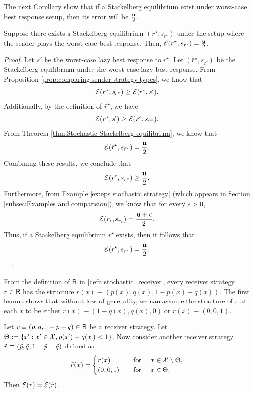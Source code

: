 The next Corollary show that if a Stackelberg equilibrium exist under worst-case best response setup, then its error will be $\frac{\mathbf{u}}{2}$.
\begin{cor}\label{cor:Stackelberg worst case best response error}
    Suppose there exists a Stackelberg equilibrium $(r^\star, s_{r^\star})$ under the setup where the sender plays the worst-case best response. Then, $\mathcal{E}(r^\star,s_{r^\star}) = \frac{\mathbf{u}}{2}$.
\end{cor}


\begin{proof}\label{proof:Stackelberg worst case best response error}
        Let $s'$ be the worst-case lazy best response to $r^\star$. Let $(\bar{r}^\star, s_{\bar{r}^\star})$ be the Stackelberg equilibrium under the worst-case lazy best response.
    From Proposition \ref{prop:comparing sender strategy types}, we know that
    \[
    \mathcal{E}(r^\star, s_{r^\star}) \geq \mathcal{E}(r^\star, s').
    \]
    Additionally, by the definition of $\bar{r}^\star$, we have
    \[
    \mathcal{E}(r^\star, s') \geq \mathcal{E}(\bar{r}^\star, s_{\bar{r}^\star}).
    \]
    From Theorem \ref{thm:Stochastic Stackelberg equilibrium}, we know that
    \[
    \mathcal{E}(\bar{r}^\star, s_{\bar{r}^\star}) = \frac{\mathbf{u}}{2}.
    \]
    Combining these results, we conclude that
    \[
    \mathcal{E}(r^\star, s_{r^\star}) \geq \frac{\mathbf{u}}{2}.
    \]
    Furthermore, from Example \ref{ex:eps stochastic strategy} (which appears in Section \ref{subsec:Examples and comparision}), we know that for every $\epsilon > 0$,
    \[
    \mathcal{E}(r_\epsilon,s_{r_\epsilon}) = \frac{\mathbf{u} + \epsilon}{2}.
    \]
    Thus, if a Stackelberg equilibrium $r^\star$ exists, then it follows that
    \[
    \mathcal{E}(r^\star,s_{r^\star}) = \frac{\mathbf{u}}{2}.
    \]
\end{proof}

From the definition of $\mathsf{R}$ in \eqref{defn:stochastic_receiver}, every receiver strategy $r \in \mathsf{R}$ has the structure $r(x) \equiv (p(x),q(x),1-p(x)-q(x))$. The first lemma shows that without loss of generality, we can assume the structure of $r$ at each $x$ to be either $r(x) \equiv (1-q(x),q(x),0)$ or $r(x) \equiv (0,0,1)$.


\begin{lem}\label{lem:delta null wlog}
    Let $r \equiv (p,q,1-p-q) \in \mathsf{R}$ be a receiver strategy. Let $\Theta := \{x': x' \in \mathcal{X}, p(x') + q(x') <1\}$. Now consider another receiver strategy $\tilde{r} \equiv (\tilde{p},\tilde{q},1-\tilde{p} - \tilde{q})$ defined as
    \[
    \tilde{r}(x) = \begin{cases}
        r(x) &\hbox{\quad for \quad} x \in \mathcal{X}\setminus \Theta,\\
        (0,0,1) &\hbox{\quad for \quad} x \in \Theta.
    \end{cases}
    \]
    Then $\mathcal{E}(r) = \mathcal{E}(\tilde{r})$.
\end{lem}


